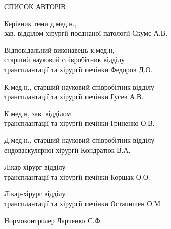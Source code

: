 \thispagestyle{empty}
\begin{center}
    \MakeUppercase{СПИСОК АВТОРІВ}
\end{center}

\noindent
Керівник теми д.мед.н.,\\
зав. відділом хірургії поєднаної патології  \hfill Скумс А.В.
\vspace{1em}
 
\noindent
Відповідальний виконавець к.мед.н, \\
старший науковий співробітник відділу\\
трансплантації та хірургії печінки \hfill Федоров Д.О.
\vspace{1em}

\noindent
К.мед.н., старший науковий співробітник відділу \\
трансплантації та хірургії печінки \hfill Гусев А.В. 
\vspace{1em}

\noindent
К.мед.н, зав. відділом \\ 
трансплантації та хірургії печінки \hfill Гриненко О.В.
\vspace{1em}

\noindent
Д.мед.н., старший науковий співробітник відділу \\
ендоваскулярної хірургії \hfill Кондратюк В.А.
\vspace{1em}

\noindent
Лікар-хірург відділу\\
трансплантації та хірургії печінки \hfill Коршак О.О.
\vspace{1em}

\noindent
Лікар-хірург відділу\\
трансплантації та хірургії печінки \hfill Остапишен О.М.
\vspace{1em}

\noindent
Нормоконтролер \hfill Ларченко С.Ф.
\vspace{1em}

\newpage